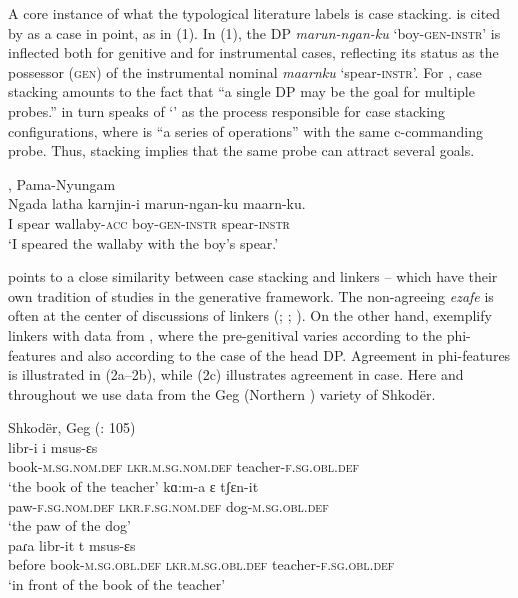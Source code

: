 \documentclass[output=paper]{langsci/langscibook}
\begin{document}
A core instance of what the typological literature labels  \citep{Plank1995} is case stacking.  is cited by \citet{Richards2013} as a case in point, as in (1). In (1), the DP \textit{marun-ngan-ku} ‘boy-\textsc{gen-instr}’ is inflected both for genitive and for instrumental cases, reflecting its status as the possessor (\textsc{gen}) of the instrumental nominal \textit{maarnku} ‘spear-\textsc{instr}’. For \citet[62]{Merchant2006}, case stacking amounts to the fact that “a single DP may be the goal for multiple probes.” \citet{Richards2013} in turn speaks of ‘’ as the process responsible for case stacking configurations, where  is “a series of  operations” with the same c-commanding probe. Thus, stacking implies that the same probe can attract several goals.

\ea%
, Pama-Nyungam \citep[43]{Richards2013}\\
\gll  Ngada latha   karnjin-i   marun-ngan-ku   maarn-ku.\\
I   spear   wallaby-\textsc{acc} boy-\textsc{gen-instr}  spear-\textsc{instr}\\
\glt ‘I speared the wallaby with the boy’s spear.’        
\z

\citet{Plank1995} points to a close similarity between case stacking and linkers – which have their own tradition of studies in the generative framework. The non-agreeing  \textit{ezafe} is often at the center of discussions of linkers (\citealt{Dikken2004}; \citealt{Larson2008}; \citealt{Richards2010}). On the other hand, \citet{Franco2015} exemplify linkers with data from , where the pre-genitival  varies according to the phi-features and also according to the case of the head DP. Agreement in phi-features is illustrated in (2a--2b), while (2c) illustrates agreement in case. Here and throughout we use data from the Geg (Northern ) variety of Shkodër.

\ea%
    Shkodër, Geg   (\citealt{Manzini2011Reducing}: 105)\label{ex:manzini:2}\\
    \ea
    \gll libr-i          i       msus-ɛs   \\
            book-\textsc{m.sg.nom.def}  \textsc{lkr.m.sg.nom.def}   teacher-\textsc{f.sg.obl.def} \\
    \glt    ‘the book of the teacher’
    \ex
    \gll kɑ:m-a      ɛ          tʃɛn-it                \\
         paw-\textsc{f.sg.nom.def}   \textsc{lkr.f.sg.nom.def}  dog-\textsc{m.sg.obl.def}  \\
    \glt ‘the paw of the dog’\\
    \ex
    \gll paɾa     libr-it       t       msus-ɛs\\
         before   book-\textsc{m.sg.obl.def}  \textsc{lkr.m.sg.obl.def}  teacher-\textsc{f.sg.obl.def}\\
    \glt ‘in front of the book of the teacher’ 
    \z
\z 
\end{document}

